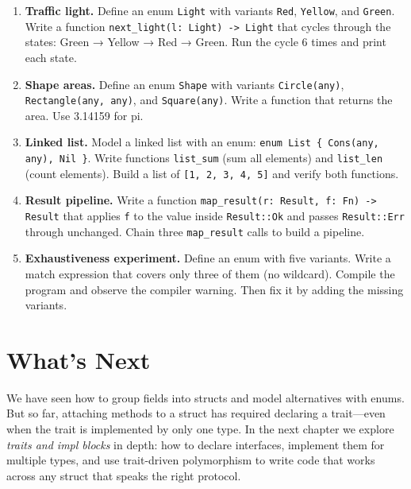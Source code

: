 \begin{enumerate}
  \item \textbf{Traffic light.}
    Define an enum \lstinline|Light| with variants \lstinline|Red|,
    \lstinline|Yellow|, and \lstinline|Green|. Write a function
    \lstinline|next_light(l: Light) -> Light| that cycles through the
    states: Green → Yellow → Red → Green. Run the cycle 6 times and
    print each state.

  \item \textbf{Shape areas.}
    Define an enum \lstinline|Shape| with variants \lstinline|Circle(any)|,
    \lstinline|Rectangle(any, any)|, and \lstinline|Square(any)|. Write a
    function that returns the area. Use 3.14159 for pi.

  \item \textbf{Linked list.}
    Model a linked list with an enum:
    \lstinline|enum List { Cons(any, any), Nil }|. Write functions
    \lstinline|list_sum| (sum all elements) and \lstinline|list_len|
    (count elements). Build a list of \lstinline|[1, 2, 3, 4, 5]| and
    verify both functions.

  \item \textbf{Result pipeline.}
    Write a function \lstinline|map_result(r: Result, f: Fn) -> Result|
    that applies \lstinline|f| to the value inside \lstinline|Result::Ok|
    and passes \lstinline|Result::Err| through unchanged. Chain three
    \lstinline|map_result| calls to build a pipeline.

  \item \textbf{Exhaustiveness experiment.}
    Define an enum with five variants. Write a match expression that covers
    only three of them (no wildcard). Compile the program and observe the
    compiler warning. Then fix it by adding the missing variants.
\end{enumerate}

\section*{What's Next}

We have seen how to group fields into structs and model alternatives with
enums. But so far, attaching methods to a struct has required declaring a
trait---even when the trait is implemented by only one type. In the next
chapter we explore \emph{traits and impl blocks} in depth: how to declare
interfaces, implement them for multiple types, and use trait-driven
polymorphism to write code that works across any struct that speaks the
right protocol.
